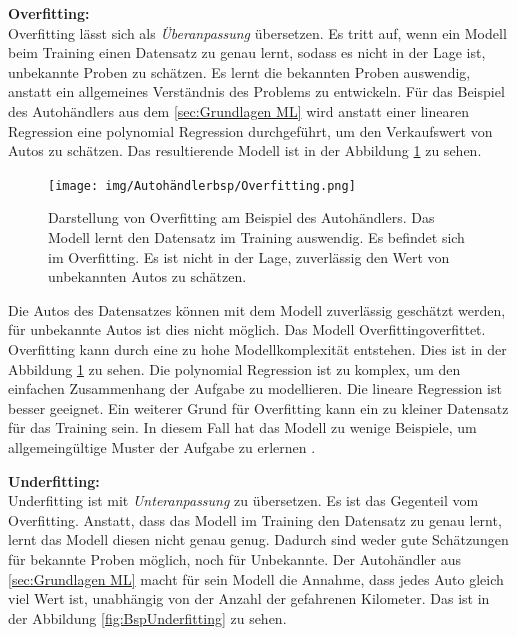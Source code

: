 \textbf{\gls{Overfitting}:}\\
\gls{Overfitting} lässt sich als \textit{Überanpassung} übersetzen. Es tritt auf, wenn ein Modell beim Training einen Datensatz zu genau lernt, sodass es nicht in der Lage ist, unbekannte Proben zu schätzen. Es lernt die bekannten Proben auswendig, anstatt ein allgemeines Verständnis des Problems zu entwickeln. Für das Beispiel des Autohändlers aus dem \autoref{sec:Grundlagen ML} wird anstatt einer linearen Regression eine polynomial Regression durchgeführt, um den Verkaufswert von Autos zu schätzen. Das resultierende Modell ist in der Abbildung \ref{fig:BspOverfitting} zu sehen.

\begin{figure}[htbp]
    \centering
    \texttt{[image: img/Autohändlerbsp/Overfitting.png]}
    \caption[Darstellung von Overfitting am Beispiel des Autohändlers.]{Darstellung von Overfitting am Beispiel des Autohändlers. Das Modell lernt den Datensatz im Training auswendig. Es befindet sich im Overfitting. Es ist nicht in der Lage, zuverlässig den Wert von unbekannten Autos zu schätzen.}
    \label{fig:BspOverfitting}
\end{figure}

Die Autos des Datensatzes können mit dem Modell zuverlässig geschätzt werden, für unbekannte Autos ist dies nicht möglich. Das Modell \gls{Overfitting}{overfittet}. \gls{Overfitting} kann durch eine zu hohe Modellkomplexität entstehen. Dies ist in der Abbildung \ref{fig:BspOverfitting} zu sehen. Die polynomial Regression ist zu komplex, um den einfachen Zusammenhang der Aufgabe zu modellieren. Die lineare Regression ist besser geeignet. Ein weiterer Grund für \gls{Overfitting} kann ein zu kleiner Datensatz für das Training sein. In diesem Fall hat das Modell zu wenige Beispiele, um allgemeingültige Muster der Aufgabe zu erlernen \cite{Burkov.2019, Bishop.2006, Goodfellow.2016}.\dubpar

\textbf{\gls{Underfitting}:}\\
\gls{Underfitting} ist mit \textit{Unteranpassung} zu übersetzen. Es ist das Gegenteil vom \gls{Overfitting}. Anstatt, dass das Modell im Training den Datensatz zu genau lernt, lernt das Modell diesen nicht genau genug. Dadurch sind weder gute Schätzungen für bekannte Proben möglich, noch für Unbekannte. Der Autohändler aus \autoref{sec:Grundlagen ML} macht für sein Modell die Annahme, dass jedes Auto gleich viel Wert ist, unabhängig von der Anzahl der gefahrenen Kilometer. Das ist in der Abbildung \ref{fig:BspUnderfitting} zu sehen.

